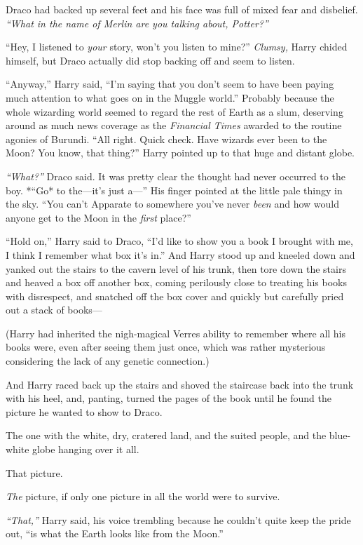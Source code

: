 Draco had backed up several feet and his face was full of mixed fear and
disbelief. \emph{``What in the name of Merlin are you talking about,
Potter?''}

``Hey, I listened to \emph{your} story, won't you listen to mine?''
\emph{Clumsy,} Harry chided himself, but Draco actually did stop backing
off and seem to listen.

``Anyway,'' Harry said, ``I'm saying that you don't seem to have been
paying much attention to what goes on in the Muggle world.'' Probably
because the whole wizarding world seemed to regard the rest of Earth as
a slum, deserving around as much news coverage as the \emph{Financial
Times} awarded to the routine agonies of Burundi. ``All right. Quick
check. Have wizards ever been to the Moon? You know, that thing?'' Harry
pointed up to that huge and distant globe.

\emph{``What?''} Draco said. It was pretty clear the thought had never
occurred to the boy. *``Go* to the---it's just a---'' His finger pointed
at the little pale thingy in the sky. ``You can't Apparate to somewhere
you've never \emph{been} and how would anyone get to the Moon in the
\emph{first} place?''

``Hold on,'' Harry said to Draco, ``I'd like to show you a book I
brought with me, I think I remember what box it's in.'' And Harry stood
up and kneeled down and yanked out the stairs to the cavern level of his
trunk, then tore down the stairs and heaved a box off another box,
coming perilously close to treating his books with disrespect, and
snatched off the box cover and quickly but carefully pried out a stack
of books---

(Harry had inherited the nigh-magical Verres ability to remember where
all his books were, even after seeing them just once, which was rather
mysterious considering the lack of any genetic connection.)

And Harry raced back up the stairs and shoved the staircase back into
the trunk with his heel, and, panting, turned the pages of the book
until he found the picture he wanted to show to Draco.

The one with the white, dry, cratered land, and the suited people, and
the blue-white globe hanging over it all.

That picture.

\emph{The} picture, if only one picture in all the world were to
survive.

\emph{``That,''} Harry said, his voice trembling because he couldn't
quite keep the pride out, ``is what the Earth looks like from the
Moon.''


